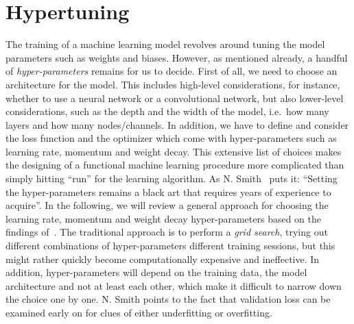 \section{Hypertuning}\label{sec:hypertuning}
The training of a machine learning model revolves around tuning the model parameters such as weights and biases. However, as mentioned already, a handful of \textit{hyper-parameters} remains for us to decide. First of all, we need to choose an architecture for the model. This includes high-level considerations, for instance, whether to use a neural network or a convolutional network, but also lower-level considerations, such as the depth and the width of the model, i.e.\ how many layers and how many nodes/channels. In addition, we have to define and consider the loss function and the optimizer which come with hyper-parameters such as learning rate, momentum and weight decay. This extensive list of choices makes the designing of a functional machine learning procedure more complicated than simply hitting ``run'' for the learning algorithm. As N. Smith~\cite{smith2018disciplined} puts it: ``Setting the
hyper-parameters remains a black art that requires years of experience to
acquire''. In the following, we will review a general approach for choosing the learning rate, momentum and weight decay hyper-parameters based on the findings of~\cite{smith2018disciplined}. The traditional approach is to
perform a \textit{grid search}, trying out different combinations of hyper-parameters different training sessions, but this might rather quickly become computationally expensive and ineffective. In addition, hyper-parameters will depend on the training data, the model architecture and not at least each other, which make it difficult to narrow down the choice one by one. N. Smith points to the fact that validation loss can be examined early on for
clues of either underfitting or overfitting. 

